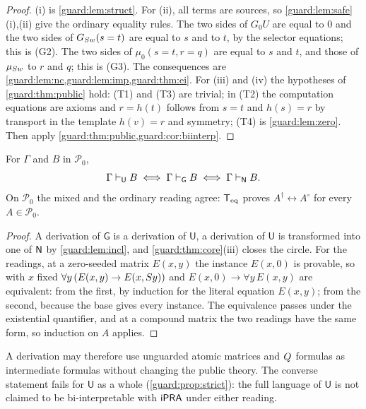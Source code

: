 \begin{proof}
(i) is \cref{guard:lem:struct}.  For (ii), all terms are sources, so
\cref{guard:lem:safe}(i),(ii) give the ordinary equality rules.  The two
sides of $G_0U$ are equal to $0$ and the two sides of $G_{S w}(s=t)$ are
equal to $s$ and to $t$, by the selector equations; this is (G2).  The two
sides of $\mu_0(s=t,r=q)$ are equal to $s$ and $t$, and those of
$\mu_{S w}$ to $r$ and $q$; this is (G3).  The consequences are
\cref{guard:lem:nc,guard:lem:imp,guard:thm:ei}.  For (iii) and (iv) the
hypotheses of \cref{guard:thm:public} hold: (T1) and (T3) are trivial; in
(T2) the computation equations are axioms and $r=h(t)$ follows from $s=t$
and $h(s)=r$ by transport in the template $h(v)=r$ and symmetry; (T4) is
\cref{guard:lem:zero}.  Then apply
\cref{guard:thm:public,guard:cor:biinterp}.
\end{proof}

\begin{corollary}
\label{guard:cor:admin}
For $\Gamma$ and $B$ in $\mathcal P_0$,
\[
 \Gamma\vdash_{\mathsf U}B
 \iff\Gamma\vdash_{\mathsf G}B
 \iff\Gamma\vdash_{\mathsf{N}}B .
\]
On $\mathcal P_0$ the mixed and the ordinary reading agree: $\mathsf{T}_{\mathrm{eq}}$ proves
$A^\dagger\leftrightarrow A^\circ$ for every $A\in\mathcal P_0$.
\end{corollary}

\begin{proof}
A derivation of $\mathsf G$ is a derivation of $\mathsf U$, a derivation of
$\mathsf U$ is transformed into one of $\mathsf{N}$ by \cref{guard:lem:incl}, and
\cref{guard:thm:core}(iii) closes the circle.  For the readings, at a
zero-seeded matrix $E(x,y)$ the instance $E(x,0)$ is provable, so with $x$
fixed $\forall y\,(E(x,y)\to E(x,S y))$ and
$E(x,0)\to\forall y\,E(x,y)$ are equivalent: from the first, by induction
for the literal equation $E(x,y)$; from the second, because the base gives
every instance.  The equivalence passes under the existential quantifier,
and at a compound matrix the two readings have the same form, so induction
on $A$ applies.
\end{proof}

A derivation may therefore use unguarded atomic matrices and $Q_{}$
formulas as intermediate formulas without changing the public theory.  The
converse statement fails for $\mathsf U$ as a whole
(\cref{guard:prop:strict}): the full language of $\mathsf U$ is not claimed
to be bi-interpretable with $\mathsf{iPRA}$ under either reading.

